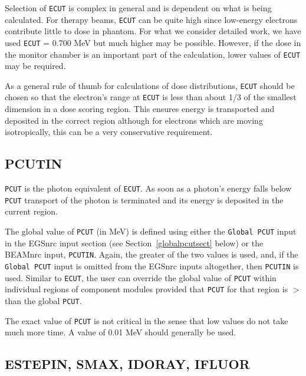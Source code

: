 \documentclass[12pt,twoside]{article}
\begin{document}
Selection of \verb+ECUT+ is complex in general and is  dependent on what
is being calculated\cite{Ro84,RB90}.  For therapy beams, \verb+ECUT+
can be quite high since low-energy electrons contribute little to dose
in phantom.  For what we consider detailed work, we have used \verb+ECUT+
= 0.700 MeV but much higher may be possible.  However, if the dose in
the monitor chamber is an important part of the calculation, lower values
of \verb+ECUT+ may be required.


As a general rule of thumb for calculations of dose distributions,
\verb+ECUT+ should be chosen so that the electron's range at \verb+ECUT+
is less than about 1/3 of the smallest dimension in a dose scoring region.
This ensures energy is transported and deposited in the correct region
although for electrons which are moving isotropically, this can be a
very conservative requirement.

\subsection{ PCUTIN}  \label{PCUTIN} 

{\tt PCUT} is the photon equivalent of {\tt ECUT}.  As soon as a
photon's energy falls below {\tt PCUT} transport of the photon is
terminated and its energy is deposited in the current region.

The global value of {\tt PCUT} (in MeV) is defined using either the
{\tt Global PCUT} input in the
EGSnrc input section (see Section~\ref{globalpcutsect} below) or the
BEAMnrc input, {\tt PCUTIN}.  Again, the greater of the two values is
used, and, if the {\tt Global PCUT} input is omitted from the EGSnrc
inputs altogether, then {\tt PCUTIN} is used.
Similar to {\tt ECUT}, the user can override the global value
of \verb+PCUT+ within individual regions of component modules provided
that {\tt PCUT} for that region is $>$ than the global {\tt PCUT}.

The exact value of \verb+PCUT+ is not critical in the sense
that low values do not take much more time. A value of 0.01 MeV should
generally be used.

\subsection{ ESTEPIN, SMAX, IDORAY, IFLUOR}
\label{dummyinputs}
\end{document}
